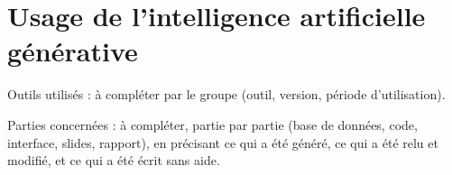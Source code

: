 \section*{Usage de l'intelligence artificielle générative}

Outils utilisés : à compléter par le groupe (outil, version, période d'utilisation).

Parties concernées : à compléter, partie par partie (base de données, code, interface,
slides, rapport), en précisant ce qui a été généré, ce qui a été relu et modifié, et ce qui
a été écrit sans aide.
